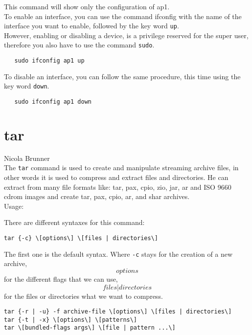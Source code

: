 \documentclass[hidelinks,12pt,a4paper,numbers=enddot]{scrartcl}
\begin{document}
This command will show only the configuration of ap1.\\

To enable an interface, you can use the command ifconfig with the name of the interface
you want to enable, followed by the key word \texttt{up}.\\

However, enabling or disabling a device, is a privilege reserved for the super user,
therefore you also have to use the command \texttt{sudo}.

\begin{verbatim}
   sudo ifconfig ap1 up
\end{verbatim}

To disable an interface, you can follow the same procedure, this time using
the key word \texttt{down}.

\begin{verbatim}
   sudo ifconfig ap1 down
\end{verbatim}

\section{tar}


\large Nicola Brunner \normalsize\\



The \texttt{tar} command is used to create and manipulate streaming archive files, in
other words it is used to compress and extract files and directories. He can
extract from many file formats like: tar, pax, cpio, zio, jar, ar and ISO 9660
cdrom images and create tar, pax, cpio, ar, and shar archives.\\

Usage:

There are different syntaxes for this command:

\begin{verbatim}
tar {-c} \[options\] \[files | directories\]
\end{verbatim}

The first one is the default syntax. Where \texttt{{-c}} stays for the
creation of a new archive, \texttt{\[options\]} for the different flags that
we can use, \texttt{\[files | directories\]} for the files or directories
what we want to compress.

\begin{verbatim}
tar {-r | -u} -f archive-file \[options\] \[files | directories\]
tar {-t | -x} \[options\] \[patterns\]
tar \[bundled-flags args\] \[file | pattern ...\]
\end{verbatim}
\end{document}
